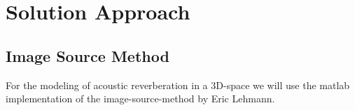 \chapter{Solution Approach}
\label{chap:approach}

\section{Image Source Method}
For the modeling of acoustic reverberation in a 3D-space we will use the matlab implementation of the image-source-method by Eric Lehmann.
